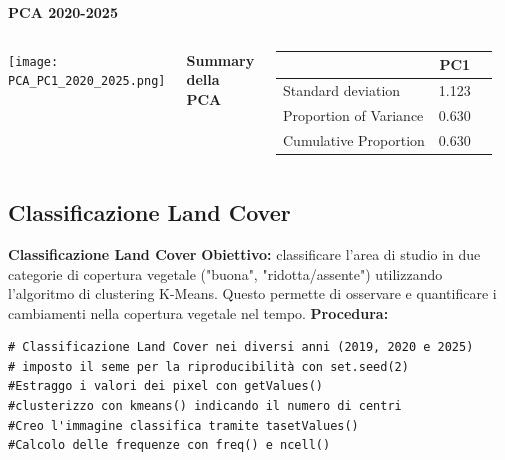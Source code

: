 \documentclass{beamer}
\begin{document}
\begin{frame}{\textbf{PCA 2020-2025}}
\begin{columns}
    \centering
    \texttt{[image: PCA\_PC1\_2020\_2025.png]}
    
    \centering
    \textbf{Summary della PCA}
    \begin{table}
        \centering
        \begin{tabular}{lcc}
            \toprule
            & PC1 \\
            \midrule
            Standard deviation     & 1.123 \\
            Proportion of Variance & 0.630 \\
            Cumulative Proportion  & 0.630 \\
            \bottomrule
        \end{tabular}
    \end{table}
\end{columns}
\end{frame}


\subsection{Classificazione Land Cover}

\begin{frame}[fragile]{\textbf{Classificazione Land Cover}}
\textbf{Obiettivo:} classificare l'area di studio in due categorie di copertura vegetale ("buona", "ridotta/assente") utilizzando l'algoritmo di clustering K-Means. Questo permette di osservare e quantificare i cambiamenti nella copertura vegetale nel tempo.
\newline
\newline
\textbf{Procedura:}
\begin{lstlisting}
# Classificazione Land Cover nei diversi anni (2019, 2020 e 2025)
# imposto il seme per la riproducibilità con set.seed(2)
#Estraggo i valori dei pixel con getValues()
#clusterizzo con kmeans() indicando il numero di centri
#Creo l'immagine classifica tramite tasetValues()
#Calcolo delle frequenze con freq() e ncell()
\end{lstlisting}
\end{frame}
\end{document}
